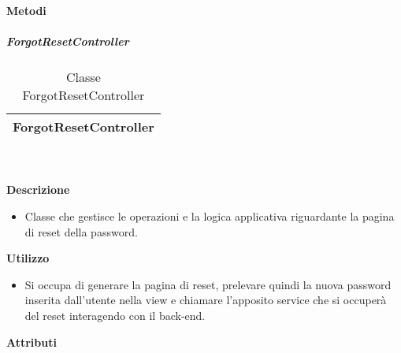 		\textbf{Metodi} 
	\begin{itemize}
		\end{itemize}
			\subparagraph{ForgotResetController} 
\begin{table}[ht]
\begin{center}
\bgroup
	\setlength{\arrayrulewidth}{0.6mm}
	\def\arraystretch{1}
		\begin{tabular}{ | p{12cm} | }
				\hline  
					\centerline{\textbf{ForgotResetController}}
		\\ \hline 
				\hline
				\hline
		
		\end{tabular}
\egroup
\caption{Classe ForgotResetController}
\end{center}
\end{table}  \textbf{\\ \\ Descrizione} 
					\begin{itemize}
						\item[] Classe che gestisce le operazioni e la logica applicativa riguardante la pagina di reset della password.
					\end{itemize}      
				\textbf{Utilizzo}  
					\begin{itemize}
						\item[] Si occupa di generare la pagina di reset, prelevare quindi la nuova password inserita dall'utente nella view e chiamare l'apposito service che si occuperà del reset interagendo con il back-end.
					\end{itemize}
			 \textbf{Attributi} 
	\begin{itemize}
		\end{itemize}
		
